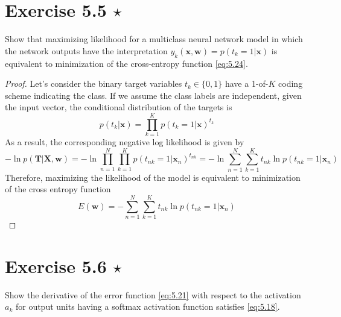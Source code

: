 \section*{Exercise 5.5 $\star$}
Show that maximizing likelihood for a multiclass neural network
model in which the network outputs have the interpretation
$y_k(\mathbf{x}, \mathbf{w}) = p(t_k = 1 | \mathbf{x})$ is equivalent to minimization
of the cross-entropy function \eqref{eq:5.24}.

\vspace{1em}

\begin{proof}
    Let's consider the binary target variables $t_k \in \{0, 1\}$ have a 1-of-$K$ 
    coding scheme indicating the class. If we assume the class labels are independent, 
    given the input vector, the conditional distribution of the targets is
    \[
        p(t_k | \mathbf{x}) = \prod_{k=1}^K p(t_k = 1 | \mathbf{x})^{t_k}
    \] 
    As a result, the corresponding negative log likelihood is given by
    \[
        -\ln p(\mathbf{T} | \mathbf{X}, \mathbf{w})
        = -\ln \prod_{n=1}^N \prod_{k=1}^K p(t_{nk} = 1 | \mathbf{x}_n)^{t_{nk}}
        = -\ln \sum_{n=1}^{N} \sum_{k=1}^{K} t_{nk} \ln p(t_{nk} = 1 | \mathbf{x}_n) 
    \]
    Therefore, maximizing the likelihood of the model is equivalent to minimization
    of the cross entropy function
    \begin{equation*}
        E(\mathbf{w}) 
        = -\sum_{n=1}^{N} \sum_{k=1}^{K} t_{nk} \ln p(t_{nk} = 1 | \mathbf{x}_n) 
        \tag{5.24}\label{eq:5.24}
    \end{equation*}
\end{proof}

\section*{Exercise 5.6 $\star$}
Show the derivative of the error function \eqref{eq:5.21} with respect
to the activation $a_k$ for output units having a softmax activation
function satisfies \eqref{eq:5.18}.

\vspace{1em}

